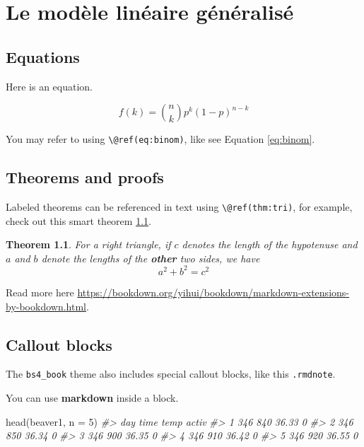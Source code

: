 \documentclass[
]{book}
\newenvironment{Shaded}{\begin{snugshade}}{\end{snugshade}}
\newcommand{\AttributeTok}[1]{\textcolor[rgb]{0.77,0.63,0.00}{#1}}
\newcommand{\CommentTok}[1]{\textcolor[rgb]{0.56,0.35,0.01}{\textit{#1}}}
\newcommand{\DecValTok}[1]{\textcolor[rgb]{0.00,0.00,0.81}{#1}}
\newcommand{\FunctionTok}[1]{\textcolor[rgb]{0.00,0.00,0.00}{#1}}
\newcommand{\NormalTok}[1]{#1}
\newtheorem{theorem}{Theorem}[chapter]
\theoremstyle{definition}
\theoremstyle{definition}
\theoremstyle{definition}
\theoremstyle{definition}
\theoremstyle{remark}
\begin{document}
\hypertarget{glm}{%
\chapter{Le modèle linéaire généralisé}\label{glm}}

\hypertarget{equations}{%
\section{Equations}\label{equations}}

Here is an equation.

\begin{equation} 
  f\left(k\right) = \binom{n}{k} p^k\left(1-p\right)^{n-k}
  \label{eq:binom}
\end{equation}

You may refer to using \texttt{\textbackslash{}@ref(eq:binom)}, like see Equation \eqref{eq:binom}.

\hypertarget{theorems-and-proofs}{%
\section{Theorems and proofs}\label{theorems-and-proofs}}

Labeled theorems can be referenced in text using \texttt{\textbackslash{}@ref(thm:tri)}, for example, check out this smart theorem \ref{thm:tri}.

\begin{theorem}
\protect\hypertarget{thm:tri}{}\label{thm:tri}For a right triangle, if \(c\) denotes the \emph{length} of the hypotenuse
and \(a\) and \(b\) denote the lengths of the \textbf{other} two sides, we have
\[a^2 + b^2 = c^2\]
\end{theorem}

Read more here \url{https://bookdown.org/yihui/bookdown/markdown-extensions-by-bookdown.html}.

\hypertarget{callout-blocks}{%
\section{Callout blocks}\label{callout-blocks}}

The \texttt{bs4\_book} theme also includes special callout blocks, like this \texttt{.rmdnote}.

You can use \textbf{markdown} inside a block.

\begin{Shaded}
\begin{Highlighting}[]
\FunctionTok{head}\NormalTok{(beaver1, }\AttributeTok{n =} \DecValTok{5}\NormalTok{)}
\CommentTok{\#\textgreater{}   day time  temp activ}
\CommentTok{\#\textgreater{} 1 346  840 36.33     0}
\CommentTok{\#\textgreater{} 2 346  850 36.34     0}
\CommentTok{\#\textgreater{} 3 346  900 36.35     0}
\CommentTok{\#\textgreater{} 4 346  910 36.42     0}
\CommentTok{\#\textgreater{} 5 346  920 36.55     0}
\end{Highlighting}
\end{Shaded}
\end{document}
